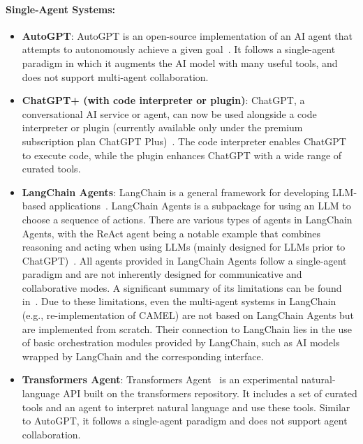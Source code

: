 \paragraph{Single-Agent Systems:}
\begin{itemize}[leftmargin=*]
    \vspace{-1mm}
    \setlength\itemsep{-0.1em}  
    \item  \textbf{AutoGPT}: 
    AutoGPT is an open-source implementation of an AI agent that attempts to autonomously achieve a given goal~\cite{autogpt}. It follows a single-agent paradigm in which it augments the AI model with many useful tools, and does not support multi-agent collaboration.
    \item \textbf{ChatGPT+ (with code interpreter or plugin)}: ChatGPT, a conversational AI service or agent, can now be used alongside a code interpreter or plugin (currently available only under the premium subscription plan ChatGPT Plus)~\cite{gptPlugin}. The code interpreter enables ChatGPT to execute code, while the plugin enhances ChatGPT with a wide range of curated tools.

    \item \textbf{LangChain Agents}: LangChain is a general framework for developing LLM-based applications~\cite{langchain}. LangChain Agents is a subpackage for using an LLM to choose a sequence of actions. There are various types of agents in LangChain Agents, with the ReAct agent being a notable example that combines reasoning and acting when using LLMs (mainly designed for LLMs prior to ChatGPT)~\cite{yao2022react}. All agents provided in LangChain Agents follow a single-agent paradigm and are not inherently designed for communicative and collaborative modes. A significant summary of its limitations can be found in~\cite{langchainproblem}. Due to these limitations, even the multi-agent systems in LangChain (e.g., re-implementation of CAMEL) are not based on LangChain Agents but are implemented from scratch. Their connection to LangChain lies in the use of basic orchestration modules provided by LangChain, such as AI models wrapped by LangChain and the corresponding interface.
    
    \item \textbf{Transformers Agent}: Transformers Agent~\cite{transformersagent} is an experimental natural-language API built on the transformers repository. It includes a set of curated tools and an agent to interpret natural language and use these tools. Similar to AutoGPT, it follows a single-agent paradigm and does not support agent collaboration.
\end{itemize}

